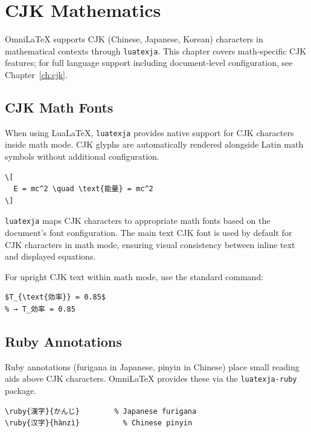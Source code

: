 \chapter{CJK Mathematics}
\label{ch:cjk-math}

OmniLaTeX supports CJK (Chinese, Japanese, Korean) characters in
mathematical contexts through \texttt{luatexja}.  This chapter covers
math-specific CJK features; for full language support including
document-level configuration, see Chapter~\ref{ch:cjk}.

\section{CJK Math Fonts}

When using LuaLaTeX, \texttt{luatexja} provides native support for CJK
characters inside math mode.  CJK glyphs are automatically rendered
alongside Latin math symbols without additional configuration.

\begin{verbatim}
\[
  E = mc^2 \quad \text{能量} = mc^2
\]
\end{verbatim}

\texttt{luatexja} maps CJK characters to appropriate math fonts based on
the document's font configuration.  The main text CJK font is used by
default for CJK characters in math mode, ensuring visual consistency
between inline text and displayed equations.

For upright CJK text within math mode, use the standard 
command:

\begin{verbatim}
$T_{\text{効率}} = 0.85$
% → T_効率 = 0.85
\end{verbatim}

\section{Ruby Annotations}

Ruby annotations (furigana in Japanese, pinyin in Chinese) place small
reading aids above CJK characters.  OmniLaTeX provides these via the
\texttt{luatexja-ruby} package.

\begin{verbatim}
\ruby{漢字}{かんじ}        % Japanese furigana
\ruby{汉字}{hànzì}          % Chinese pinyin
\end{verbatim}

